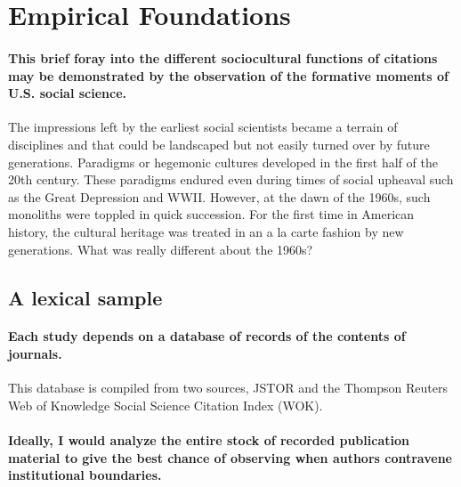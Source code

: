 \documentclass[]{article}
\begin{document}
\section{Empirical Foundations}\label{empirical-foundations}

\paragraph{This brief foray into the different sociocultural functions
of citations may be demonstrated by the observation of the formative
moments of U.S. social
science.}\label{this-brief-foray-into-the-different-sociocultural-functions-of-citations-may-be-demonstrated-by-the-observation-of-the-formative-moments-of-u.s.-social-science.}

The impressions left by the earliest social scientists became a terrain
of disciplines and that could be landscaped but not easily turned over
by future generations. Paradigms or hegemonic cultures developed in the
first half of the 20th century. These paradigms endured even during
times of social upheaval such as the Great Depression and WWII. However,
at the dawn of the 1960s, such monoliths were toppled in quick
succession. For the first time in American history, the cultural
heritage was treated in an a la carte fashion by new generations. What
was really different about the 1960s?

\subsection{A lexical sample}\label{a-lexical-sample}

\paragraph{Each study depends on a database of records of the contents
of
journals.}\label{each-study-depends-on-a-database-of-records-of-the-contents-of-journals.}

This database is compiled from two sources, JSTOR and the Thompson
Reuters Web of Knowledge Social Science Citation Index (WOK).

\paragraph{Ideally, I would analyze the entire stock of recorded
publication material to give the best chance of observing when authors
contravene institutional
boundaries.}\label{ideally-i-would-analyze-the-entire-stock-of-recorded-publication-material-to-give-the-best-chance-of-observing-when-authors-contravene-institutional-boundaries.}
\end{document}
